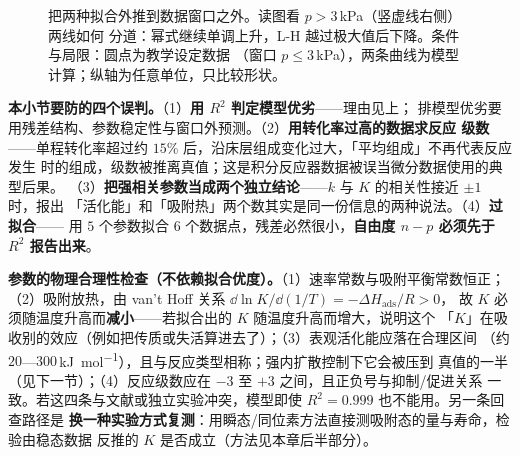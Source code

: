 \begin{figure}[htbp]
\centering
{}
\caption{把两种拟合外推到数据窗口之外。读图看 $p>3$\,\unit{kPa}（竖虚线右侧）两线如何
分道：幂式继续单调上升，L-H 越过极大值后下降。条件与局限：圆点为教学设定数据
（窗口 $p\le3$\,\unit{kPa}），两条曲线为模型计算；纵轴为任意单位，只比较形状。
\modelmark}
\label{fig:ch10-extrap}
\end{figure}

\begin{pitfall}
\textbf{本小节要防的四个误判。}（1）\textbf{用 $R^2$ 判定模型优劣}——理由见上；
排模型优劣要用残差结构、参数稳定性与窗口外预测。（2）\textbf{用转化率过高的数据求反应
级数}——单程转化率超过约 $15\%$ 后，沿床层组成变化过大，「平均组成」不再代表反应发生
时的组成，级数被推离真值；这是积分反应器数据被误当微分数据使用的典型后果。
（3）\textbf{把强相关参数当成两个独立结论}——$k$ 与 $K$ 的相关性接近 $\pm1$ 时，报出
「活化能」和「吸附热」两个数其实是同一份信息的两种说法。（4）\textbf{过拟合}——
用 $5$ 个参数拟合 $6$ 个数据点，残差必然很小，\textbf{自由度 $n-p$ 必须先于 $R^2$
报告出来}。
\end{pitfall}

\begin{crosscheck}
\textbf{参数的物理合理性检查（不依赖拟合优度）。}（1）速率常数与吸附平衡常数恒正；
（2）吸附放热，由 van't Hoff 关系 $\dd\ln K/\dd(1/T)=-\Delta H_{\mathrm{ads}}/R>0$，
故 $K$ 必须随温度升高而\textbf{减小}——若拟合出的 $K$ 随温度升高而增大，说明这个
「$K$」在吸收别的效应（例如把传质或失活算进去了）；（3）表观活化能应落在合理区间
（约 $20$—$300$\,\unit{kJ.mol^{-1}}），且与反应类型相称；强内扩散控制下它会被压到
真值的一半（见下一节）；（4）反应级数应在 $-3$ 至 $+3$ 之间，且正负号与抑制/促进关系
一致。若这四条与文献或独立实验冲突，模型即使 $R^2=0.999$ 也不能用。另一条回查路径是
\textbf{换一种实验方式复测}：用瞬态/同位素方法直接测吸附态的量与寿命，检验由稳态数据
反推的 $K$ 是否成立（方法见本章后半部分）。
\end{crosscheck}

